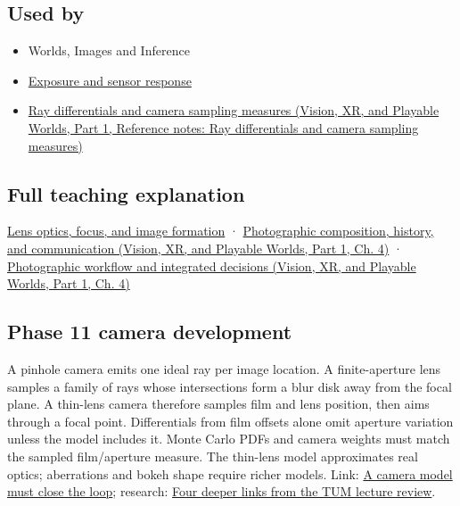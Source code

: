 \subsection{Used by}\label{appendix-21f8456e2629-used-by}

\hypertarget{appendix-21f8456e2629-used-by}{}

\begin{itemize}
\item
  {Worlds, Images and Inference}
\item
  \hyperref[appendix-92d45cdf2afc]{Exposure and sensor response}
\item
  \href{../07-Vision-XR-and-Playable-Worlds-P01/main.pdf\#nameddest=appendix-8c40fad29462}{Ray differentials and camera sampling measures (Vision, XR, and Playable Worlds, Part 1, Reference notes: Ray differentials and camera sampling measures)}
\end{itemize}

\subsection{Full teaching explanation}\label{appendix-21f8456e2629-full-teaching-explanation}

\hypertarget{appendix-21f8456e2629-full-teaching-explanation}{}

\hyperref[03-visual-computing-i-ch003-lens-optics-focus-and-image-formation]{Lens optics, focus, and image formation} · \href{../07-Vision-XR-and-Playable-Worlds-P01/main.pdf\#nameddest=04-visual-computing-ii-ch034-photographic-composition-history-and-communication}{Photographic composition, history, and communication (Vision, XR, and Playable Worlds, Part 1, Ch. 4)} · \href{../07-Vision-XR-and-Playable-Worlds-P01/main.pdf\#nameddest=04-visual-computing-ii-ch034-photographic-workflow-and-integrated-decisions}{Photographic workflow and integrated decisions (Vision, XR, and Playable Worlds, Part 1, Ch. 4)}

\subsection{Phase 11 camera development}\label{appendix-21f8456e2629-phase-11-camera-development}

\hypertarget{appendix-21f8456e2629-phase-11-camera-development}{}

A pinhole camera emits one ideal ray per image location. A finite-aperture lens samples a family of rays whose intersections form a blur disk away from the focal plane. A thin-lens camera therefore samples film and lens position, then aims through a focal point. Differentials from film offsets alone omit aperture variation unless the model includes it. Monte Carlo PDFs and camera weights must match the sampled film/aperture measure. The thin-lens model approximates real optics; aberrations and bokeh shape require richer models. Link: \hyperref[02-foundations-ii-ch037-a-camera-model-must-close-the-loop]{A camera model must close the loop}; research: \hyperref[02-foundations-ii-ch036-four-deeper-links-from-the-tum-lecture-review]{Four deeper links from the TUM lecture review}.
